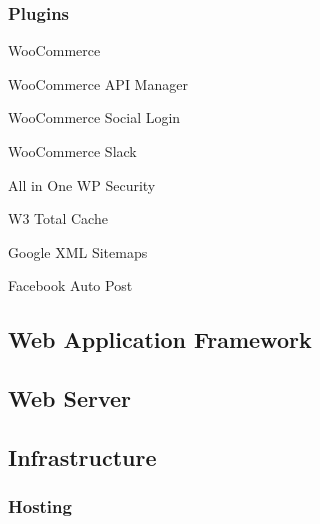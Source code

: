 \documentclass[letterpaper,11pt,2p]{elsarticle}
\begin{document}
\subsubsection{Plugins}
\medskip
{\large WooCommerce }



\medskip
{\large WooCommerce API Manager}



\medskip
{\large WooCommerce Social Login}



\medskip
{\large WooCommerce Slack}



\medskip
{\large All in One WP Security}



\medskip
{\large W3 Total Cache}



\medskip
{\large Google XML Sitemaps}




\medskip
{\large Facebook Auto Post}





\subsection{ Web Application Framework}
\label{subsec1}





\subsection{ Web Server}
\label{subsec1}





\subsection{ Infrastructure}
\label{subsec1}





\subsubsection{ Hosting}
\label{subsec1}
\end{document}
